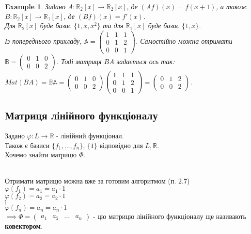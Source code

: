 \documentclass[a4paper, 10pt]{article}
\theoremstyle{theoremdd}
\theoremstyle{theoremdd}
\theoremstyle{theoremdd}
\theoremstyle{theoremdd}
\newtheorem{example}[theorem]{Example}
\theoremstyle{theoremdd}
\theoremstyle{theoremdd}
\theoremstyle{theoremdd}
\theoremstyle{theoremdd}
\begin{document}
	\begin{example}
	Задано $A: \mathbb{R}_2[x] \to \mathbb{R}_2[x]$, де $(Af)(x) = f(x+1)$, а також $B: \mathbb{R}_2[x] \to \mathbb{R}_1[x]$, де $(Bf)(x) = f'(x)$.\\
	Для $\mathbb{R}_2[x]$ буде базис $\{1,x,x^2\}$ та для $\mathbb{R}_1[x]$ буде базис $\{1,x\}$.\\
	Із попереднього прикладу, $\mathbb{A} = \begin{pmatrix}
	1 & 1 & 1 \\
	0 & 1 & 2 \\
	0 & 0 & 1
	\end{pmatrix}$. Самостійно можна отримати $\mathbb{B} = \begin{pmatrix}
	0 & 1 & 0 \\
	0 & 0 & 2
	\end{pmatrix}$. Тоді матриця $BA$ задається ось так:\\
	$Mat (BA) = \mathbb{B} \mathbb{A} =  \begin{pmatrix}
	0 & 1 & 0 \\
	0 & 0 & 2
	\end{pmatrix} \begin{pmatrix}
	1 & 1 & 1 \\
	0 & 1 & 2 \\
	0 & 0 & 1
	\end{pmatrix} = \begin{pmatrix}
	0 & 1 & 2 \\
	0 & 0 & 2
	\end{pmatrix}$.
	\end{example}	
	
	\subsection{Матриця лінійного функціоналу}
	Задано $\varphi: L \to \mathbb{R}$ - лінійний функціонал.\\
	Також є базиси $\{f_1,\dots,f_n\}$, $\{1\}$ відповідно для $L,\mathbb{R}$.\\
	Хочемо знайти матрицю $\Phi$.\\
	\\
Отримати матрицю можна вже за готовим алгоритмом (п. 2.7)\\
	$\varphi(f_1) = a_1 = a_1 \cdot 1$\\
	$\varphi(f_2) = a_2 = a_2 \cdot 1$\\
	$\vdots$\\
	$\varphi(f_n) = a_n = a_n \cdot 1$\\
	$\implies \Phi = \begin{pmatrix} a_1 & a_2 & \dots & a_n \end{pmatrix}$ - цю матрицю лінійного функціоналу ще називають \textbf{ковектором}.
	
\end{document}
